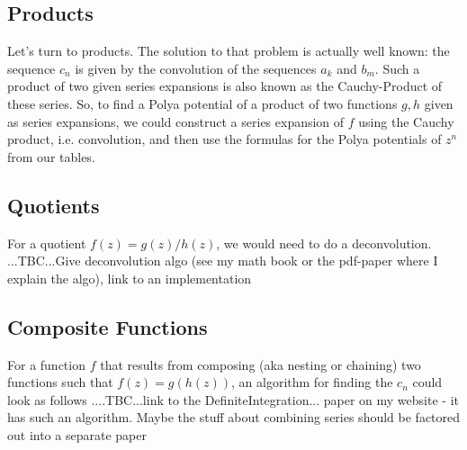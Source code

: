 \documentclass[12pt]{article}
\begin{document}
\subsection{Products}
Let's turn to products. The solution to that problem is actually well known: the sequence $c_n$ is given by the convolution of the sequences $a_k$ and $b_m$. Such a product of two given series expansions is also known as the Cauchy-Product of these series. So, to find a Polya potential of a product of two functions $g,h$ given as series expansions, we could construct a series expansion of $f$ using the Cauchy product, i.e. convolution, and then use the formulas for the Polya potentials of $z^n$ from our tables. 

\subsection{Quotients}
For a quotient $f(z) = g(z) / h(z)$, we would need to do a deconvolution. ...TBC...Give deconvolution algo (see my math book or the pdf-paper where I explain the algo), link to an implementation

\subsection{Composite Functions}
For a function $f$ that results from composing (aka nesting or chaining) two functions such that $f(z) = g(h(z))$, an algorithm for finding the $c_n$ could look as follows ....TBC...link to the DefiniteIntegration... paper on my website - it has such an algorithm. Maybe the stuff about combining series should be factored out into a separate paper 



\end{document}
